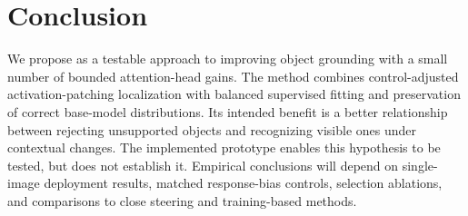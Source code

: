\section{Conclusion}
We propose \method as a testable approach to improving object grounding
with a small number of bounded attention-head gains. The method combines
control-adjusted activation-patching localization with balanced supervised
fitting and preservation of correct base-model distributions. Its intended
benefit is a better relationship between rejecting unsupported objects and
recognizing visible ones under contextual changes. The implemented
prototype enables this hypothesis to be tested, but does not establish it.
Empirical conclusions will depend on single-image deployment results,
matched response-bias controls, selection ablations, and comparisons to
close steering and training-based methods.
